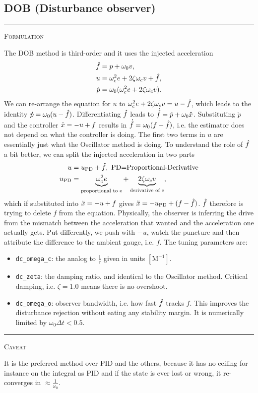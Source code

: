 \documentclass{article}
\newcommand{\var}[1]{%
  {\setlength{\fboxsep}{1.5pt}%
   \colorbox{varbg}{\textcolor{varfg}{\texttt{\small #1}}}}}
\newcommand{\step}[1]{%
  \par\medskip\noindent
  {\color{stepfg}\rule[-0.15ex]{2pt}{1.5ex}\hspace{0.5em}\scshape #1}%
  \hspace{0.75em}\ignorespaces}
\begin{document}
\subsection*{DOB (Disturbance observer)}
\step{Formulation} The DOB method is third-order and it uses the injected acceleration
\begin{align}
  \Hat{f}&=p+\omega_0v,\\
  u&=\omega_c^2e+2\zeta\omega_cv+\Hat{f},\\
  \Dot{p}&=\omega_0(\omega_c^2e+2\zeta\omega_cv).
\end{align}
We can re-arrange the equation for $u$ to $\omega_c^2e+2\zeta\omega_cv=u-\Hat{f}$, which leads to the identity $\Dot{p}=\omega_0(u-\Hat{f})$.
Differentiating $\Hat{f}$ leads to $\Dot{\Hat{f}}=\Dot{p}+\omega_0\Ddot{x}$. Substituting $\Dot{p}$ and the controller $\Ddot{x}=-u+f$ results in
$\Dot{\Hat{f}}=\omega_0(f-\Hat{f})$, i.e. the estimator does not depend on what the controller is doing. The first two terms in $u$ are essentially just what
the Oscillator method is doing. To understand the role of $\Hat{f}$ a bit better, we can split the injected acceleration in two parts
\begin{align}
  u&=u_{\mathrm{PD}}+\Hat{f},\ \text{PD=Proportional-Derivative}\\
  u_{\mathrm{PD}}&=\underbrace{\omega_c^2e}_{\text{proportional to e}}+\underbrace{2\zeta\omega_cv}_{\text{derivative of e}},
\end{align}
which if substituted into $\Ddot{x}=-u+f$ gives $\Ddot{x}=-u_{\mathrm{PD}}+(f-\Hat{f})$. $\Hat{f}$ therefore is trying to delete $f$ from the equation. Physically, the
observer is inferring the drive from the mismatch between the acceleration that wanted and the acceleration one actually gets. Put differently, we push with $-u$, watch the
puncture and then attribute the difference to the ambient gauge, i.e. $f$.
The tuning parameters are:
\begin{itemize}
  \item \var{dc\_omega\_c}: the analog to $\frac{1}{\tau}$ given in units $[\mathrm{M}^{-1}]$.
  \item \var{dc\_zeta}: the damping ratio, and identical to the Oscillator method. Critical damping, i.e. $\zeta=1.0$ means there is no overshoot.
  \item \var{dc\_omega\_o}: observer bandwidth, i.e. how fast $\Hat{f}$ tracks $f$. This improves the
  disturbance rejection without eating any stability margin. It is numerically limited by $\omega_0\Delta t<0.5$.
\end{itemize}
\step{Caveat} It is the preferred method over PID and the others, because it has no ceiling for instance on the integral as PID and if
the state is ever lost or wrong, it re-converges in $\approx\frac{1}{\omega_0}$.
\end{document}

